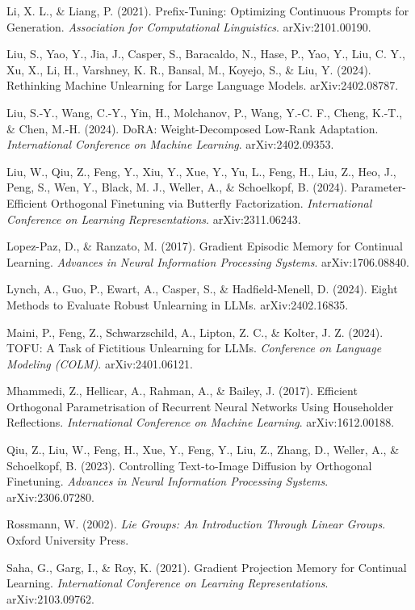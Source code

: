 \documentclass[
]{article}
\begin{document}
Li, X. L., \& Liang, P. (2021). Prefix-Tuning: Optimizing Continuous Prompts for Generation. \emph{Association for Computational Linguistics}. arXiv:2101.00190.

Liu, S., Yao, Y., Jia, J., Casper, S., Baracaldo, N., Hase, P., Yao, Y., Liu, C. Y., Xu, X., Li, H., Varshney, K. R., Bansal, M., Koyejo, S., \& Liu, Y. (2024). Rethinking Machine Unlearning for Large Language Models. arXiv:2402.08787.

Liu, S.-Y., Wang, C.-Y., Yin, H., Molchanov, P., Wang, Y.-C. F., Cheng, K.-T., \& Chen, M.-H. (2024). DoRA: Weight-Decomposed Low-Rank Adaptation. \emph{International Conference on Machine Learning}. arXiv:2402.09353.

Liu, W., Qiu, Z., Feng, Y., Xiu, Y., Xue, Y., Yu, L., Feng, H., Liu, Z., Heo, J., Peng, S., Wen, Y., Black, M. J., Weller, A., \& Schoelkopf, B. (2024). Parameter-Efficient Orthogonal Finetuning via Butterfly Factorization. \emph{International Conference on Learning Representations}. arXiv:2311.06243.

Lopez-Paz, D., \& Ranzato, M. (2017). Gradient Episodic Memory for Continual Learning. \emph{Advances in Neural Information Processing Systems}. arXiv:1706.08840.

Lynch, A., Guo, P., Ewart, A., Casper, S., \& Hadfield-Menell, D. (2024). Eight Methods to Evaluate Robust Unlearning in LLMs. arXiv:2402.16835.

Maini, P., Feng, Z., Schwarzschild, A., Lipton, Z. C., \& Kolter, J. Z. (2024). TOFU: A Task of Fictitious Unlearning for LLMs. \emph{Conference on Language Modeling (COLM)}. arXiv:2401.06121.

Mhammedi, Z., Hellicar, A., Rahman, A., \& Bailey, J. (2017). Efficient Orthogonal Parametrisation of Recurrent Neural Networks Using Householder Reflections. \emph{International Conference on Machine Learning}. arXiv:1612.00188.

Qiu, Z., Liu, W., Feng, H., Xue, Y., Feng, Y., Liu, Z., Zhang, D., Weller, A., \& Schoelkopf, B. (2023). Controlling Text-to-Image Diffusion by Orthogonal Finetuning. \emph{Advances in Neural Information Processing Systems}. arXiv:2306.07280.

Rossmann, W. (2002). \emph{Lie Groups: An Introduction Through Linear Groups}. Oxford University Press.

Saha, G., Garg, I., \& Roy, K. (2021). Gradient Projection Memory for Continual Learning. \emph{International Conference on Learning Representations}. arXiv:2103.09762.
\end{document}
